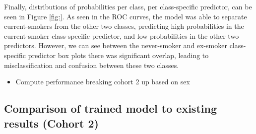 \documentclass[draft]{article}
\begin{document}
Finally, distributions of probabilities per class, per class-specific predictor, can be seen in Figure \ref{fig:}. As seen in the ROC curves, the model was able to separate current-smokers from the other two classes, predicting high probabilities in the current-smoker class-specific predictor, and low probabilities in the other two predictors. However, we can see between the never-smoker and ex-smoker class-specific predictor box plots there was significant overlap, leading to misclassification and confusion between these two classes.

\begin{itemize}
    \item Compute performance breaking cohort 2 up based on sex
\end{itemize}


\subsection{Comparison of trained model to existing results (Cohort 2)} \label{sec:model-comparisons}

\end{document}
